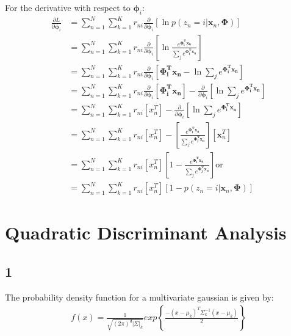\documentclass[a4paper]{article}
\begin{document}
For the derivative with respect to $\pmb{\phi}_{i}$:
\begin{align*}
    \frac{\partial L}{\partial \pmb{\phi}_{i}} &= \sum_{n=1}^{N} \sum_{k=1}^{K} r_{ni}\frac{\partial}{\partial \pmb{\phi}_{i}} \left[\ln{p(z_{n}=i|\pmb{x}_{n},\pmb{\Phi})}\right] \\
    &= \sum_{n=1}^{N} \sum_{k=1}^{K} r_{ni}\frac{\partial}{\partial \pmb{\phi}_{i}} \left[
    \ln{\frac{e^{\pmb{\Phi_{i}^{T}x_{n}}}}{\sum_{j}e^{\pmb{\Phi_{i}^{T}x_{n}}}}}
    \right] \\
    &= \sum_{n=1}^{N} \sum_{k=1}^{K} r_{ni}\frac{\partial}{\partial \pmb{\phi}_{i}} \left[\pmb{\Phi_{i}^{T}x_{n}} - \ln{\sum_{j} e^{\pmb{\Phi_{i}^{T}x_{n}}}}
     \right] \\
    &= \sum_{n=1}^{N} \sum_{k=1}^{K} r_{ni}\frac{\partial}{\partial \pmb{\phi}_{i}} \left[\pmb{\Phi_{i}^{T}x_{n}}\right] - 
    \frac{\partial}{\partial \pmb{\phi}_{i}} \left[\ln{\sum_{j} e^{\pmb{\Phi_{i}^{T}x_{n}}}}\right] \\
    &= \sum_{n=1}^{N} \sum_{k=1}^{K} r_{ni}\left[x_{n}^{T} \right] - \frac{\partial}{\partial \pmb{\phi}_{i}} \left[\ln{\sum_{j} e^{\pmb{\Phi_{i}^{T}x_{n}}}}\right] \\
    &= \sum_{n=1}^{N} \sum_{k=1}^{K} r_{ni}\left[x_{n}^{T} \right] - \left[\frac{e^{\pmb{\Phi_{i}^{T}x_{n}}}}{\sum_{j}e^{\pmb{\Phi_{j}^{T}x_{n}}}}\right][\pmb{x}_{n}^{T}] \\
    &= \sum_{n=1}^{N} \sum_{k=1}^{K} r_{ni}\left[x_{n}^{T} \right] \left[ 1 - \frac{e^{\pmb{\Phi_{i}^{T}x_{n}}}}{\sum_{j}e^{\pmb{\Phi_{j}^{T}x_{n}}}}\right]
    \text{or}\\
    &= \sum_{n=1}^{N} \sum_{k=1}^{K} r_{ni}\left[x_{n}^{T} \right] \left[ 1 - p(z_{n}=i|\pmb{x}_{n}, \pmb{\Phi})\right]
\end{align*}{}

\section*{Quadratic Discriminant Analysis}
\subsection*{1}
The probability density function for a multivariate gaussian is given by:
\begin{align*}
    f(x) = \frac{1}{\sqrt{(2\pi)^{d}|\Sigma|_{k}}}exp\left\{
    \frac{-(x-\mu_{k})^{T}\Sigma^{-1}_{k}(x-\mu_{k})}{2}
    \right\}
\end{align*}
\end{document}
